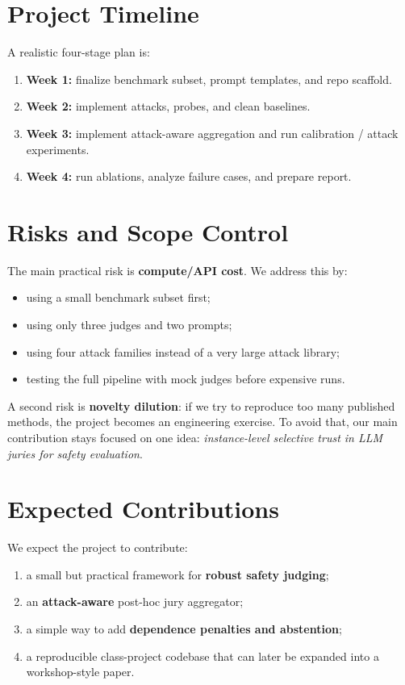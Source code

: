\documentclass[11pt]{article}
\begin{document}
\section{Project Timeline}
A realistic four-stage plan is:
\begin{enumerate}
    \item \textbf{Week 1:} finalize benchmark subset, prompt templates, and repo scaffold.
    \item \textbf{Week 2:} implement attacks, probes, and clean baselines.
    \item \textbf{Week 3:} implement attack-aware aggregation and run calibration / attack experiments.
    \item \textbf{Week 4:} run ablations, analyze failure cases, and prepare report.
\end{enumerate}

\section{Risks and Scope Control}
The main practical risk is \textbf{compute/API cost}. We address this by:
\begin{itemize}
    \item using a small benchmark subset first;
    \item using only three judges and two prompts;
    \item using four attack families instead of a very large attack library;
    \item testing the full pipeline with mock judges before expensive runs.
\end{itemize}

A second risk is \textbf{novelty dilution}: if we try to reproduce too many published methods, the project becomes an engineering exercise. To avoid that, our main contribution stays focused on one idea: \emph{instance-level selective trust in LLM juries for safety evaluation}.

\section{Expected Contributions}
We expect the project to contribute:
\begin{enumerate}
    \item a small but practical framework for \textbf{robust safety judging};
    \item an \textbf{attack-aware} post-hoc jury aggregator;
    \item a simple way to add \textbf{dependence penalties and abstention};
    \item a reproducible class-project codebase that can later be expanded into a workshop-style paper.
\end{enumerate}
\end{document}
